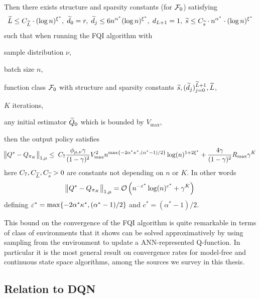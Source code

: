 \begin{thm}
  Then there exists structure and sparsity constants (for $\mathcal{F}_0$)
  satisfying
  \[ \widetilde{L} \leq C_{\widetilde{L}} \cdot (\log n)^{\xi^*},\;
    \widetilde{d}_0 = r,\; \widetilde{d}_j \leq 6 n^{\alpha^*} (\log n)^{\xi^*},\;
    d_{L+1} = 1,\;
  \widetilde{s} \leq C_{\widetilde{s}} \cdot n^{\alpha^*} \cdot (\log n)^{\xi^*} \]
  such that when running the FQI algorithm with
  \begin{enumerate*}[label=(\roman*.),itemjoin = \hspace{0.2cm}]
    \item sample distribution $\nu$,
    \item batch size $n$,
    \item function class
      $\mathcal{F}_0$ with structure and sparsity constants 
      $\widetilde{s}, (\widetilde{d}_j)_{j=0}^{\widetilde{L}+1}, \widetilde{L}$,
    \item $K$ iterations,
    \item any initial estimator $\widetilde{Q}_0$ which is bounded by $V_{\max}$,
  \end{enumerate*}
  then the output policy satisfies
  \[ \norm{Q^* - Q_{\pi_K}}_{1, \mu} \leq \;
    C_7 \frac{\phi_{\mu, \nu} \gamma}{(1-\gamma)^2} V_{\max}^2
    n^{\max\{-2\alpha^*\kappa^*, (\alpha^*  - 1)/2 \}} \log(n)^{1+2\xi^*}
    + \frac{4 \gamma}{(1-\gamma)^2} R_{\max} \gamma^K
  \]
  here $C_7, C_{\widetilde{L}}, C_{\widetilde{s}}>0$ are constants
  not depending on $n$ or $K$.
  In other words
  \[ \norm{Q^* - Q_{\pi_K}}_{1, \mu} =
  \mathcal{O}\left( n^{-\varepsilon^*} \log(n)^{c^*} + \gamma^K \right) \]
  defining $\varepsilon^* = \max\{-2\alpha^*\kappa^*, (\alpha^*  - 1)/2 \}$
  and $c^* = (\alpha^* - 1)/2$.
\end{thm}

This bound on the convergence of the FQI algorithm
is quite remarkable in terms of class
of environments that it shows can be solved approximatively by using
sampling from the environment to update a ANN-represented Q-function.
In particular it is the most general result on convergence rates for
model-free and continuous state space algorithms,
among the sources we survey in this thesis.

\subsection{Relation to DQN}

